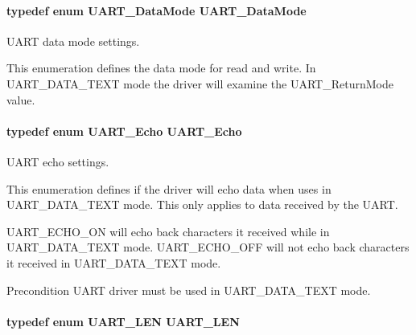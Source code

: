 \paragraph[{U\+A\+R\+T\+\_\+\+Data\+Mode}]{\setlength{\rightskip}{0pt plus 5cm}typedef enum {\bf U\+A\+R\+T\+\_\+\+Data\+Mode}  {\bf U\+A\+R\+T\+\_\+\+Data\+Mode}}\label{_u_a_r_t_8h_a5d5d37ac84acc0ea543ef3737460d41a}


U\+A\+R\+T data mode settings. 

This enumeration defines the data mode for read and write. In U\+A\+R\+T\+\_\+\+D\+A\+T\+A\+\_\+\+T\+E\+X\+T mode the driver will examine the U\+A\+R\+T\+\_\+\+Return\+Mode value. 
\paragraph[{U\+A\+R\+T\+\_\+\+Echo}]{\setlength{\rightskip}{0pt plus 5cm}typedef enum {\bf U\+A\+R\+T\+\_\+\+Echo}  {\bf U\+A\+R\+T\+\_\+\+Echo}}\label{_u_a_r_t_8h_a5372f2a3d7f68aa38ea560ed5fe520a9}


U\+A\+R\+T echo settings. 

This enumeration defines if the driver will echo data when uses in U\+A\+R\+T\+\_\+\+D\+A\+T\+A\+\_\+\+T\+E\+X\+T mode. This only applies to data received by the U\+A\+R\+T.

U\+A\+R\+T\+\_\+\+E\+C\+H\+O\+\_\+\+O\+N will echo back characters it received while in U\+A\+R\+T\+\_\+\+D\+A\+T\+A\+\_\+\+T\+E\+X\+T mode. U\+A\+R\+T\+\_\+\+E\+C\+H\+O\+\_\+\+O\+F\+F will not echo back characters it received in U\+A\+R\+T\+\_\+\+D\+A\+T\+A\+\_\+\+T\+E\+X\+T mode.

\begin{DoxyPrecond}{Precondition}
U\+A\+R\+T driver must be used in U\+A\+R\+T\+\_\+\+D\+A\+T\+A\+\_\+\+T\+E\+X\+T mode. 
\end{DoxyPrecond}
\paragraph[{U\+A\+R\+T\+\_\+\+L\+E\+N}]{\setlength{\rightskip}{0pt plus 5cm}typedef enum {\bf U\+A\+R\+T\+\_\+\+L\+E\+N}  {\bf U\+A\+R\+T\+\_\+\+L\+E\+N}}\label{_u_a_r_t_8h_a9290f6d71215e218998106ddff83911b}


